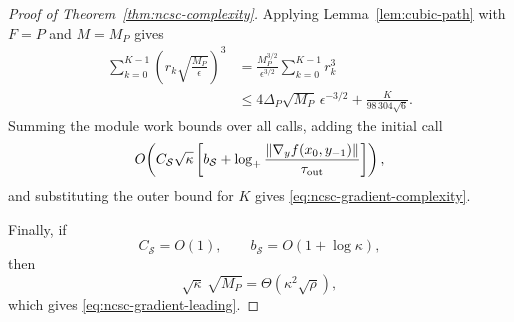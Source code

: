 \begin{proof}[Proof of Theorem~\ref{thm:ncsc-complexity}]
Applying Lemma~\ref{lem:cubic-path} with
$F=P$ and $M=M_P$ gives
\begin{align*}
    \sum_{k=0}^{K-1}
    \left(
        r_k\sqrt{\frac{M_P}{\epsilon}}
    \right)^3
    &=
    \frac{M_P^{3/2}}{\epsilon^{3/2}}
    \sum_{k=0}^{K-1}r_k^3
    \\
    &\le
    4\Delta_P\sqrt{M_P}\,
    \epsilon^{-3/2}
    +
    \frac{K}{98\,304\sqrt6}.
\end{align*}
Summing the module work bounds over all calls, adding the initial
call
\[
    O\!\left(
        C_{\mathcal S}\sqrt\kappa
        \left[
            b_{\mathcal S}
            +
            \log_+
            \frac{
                \|\nabla_yf(x_0,y_{-1})\|
            }{
                \tau_{\rm out}
            }
        \right]
    \right),
\]
and substituting the outer bound for $K$ gives
\eqref{eq:ncsc-gradient-complexity}.

Finally, if
\[
    C_{\mathcal S}=O(1),
    \qquad
    b_{\mathcal S}=O(1+\log\kappa),
\]
then
\[
    \sqrt\kappa\,\sqrt{M_P}
    =
    \Theta(\kappa^2\sqrt\rho),
\]
which gives
\eqref{eq:ncsc-gradient-leading}.
\end{proof}